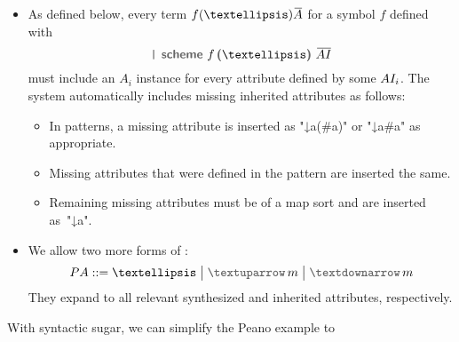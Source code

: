 \documentclass[letterpaper,11pt]{article}
\begin{document}
\begin{notation}
\begin{itemize}
  \item As defined below, every term $f(…)\ov{A}$ for a symbol $f$ defined with
    \begin{displaymath}
      \kw{\texttt{|} scheme}~f\,\kw(…\kw)~\ov{\set{AI}}
    \end{displaymath}
    must include an $A_i$ instance for every attribute defined by some $AI_i$.  The system
    automatically includes missing inherited attributes as follows:
    \begin{itemize}
    \item In patterns, a missing attribute is inserted as "↓a(#a)" or "↓a{#a}" as appropriate.
    \item Missing attributes that were defined in the pattern are inserted the same.
    \item Remaining missing attributes must be of a map sort and are inserted as~"↓a{}".
    \end{itemize}

  \item We allow two more forms of :
    \begin{displaymath}
      \set{PA} ::= {…} \bigm| \kw{$↑$}\,m \bigm| \kw{$↓$}\,m
    \end{displaymath}
    They expand to all relevant synthesized and inherited attributes, respectively.

  \end{itemize}
\end{notation}

\begin{example}
  With syntactic sugar, we can simplify the Peano example to
\end{example}
\end{document}
